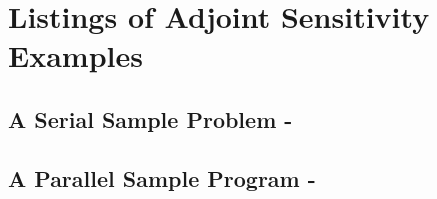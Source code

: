 \section{Listings of {\cvodes} Adjoint Sensitivity Examples}\label{s:adj_codes}

\subsection{A Serial Sample Problem - }\label{ss:cvadx}

\newpage
\subsection{A Parallel Sample Program - }\label{ss:pvanx}
